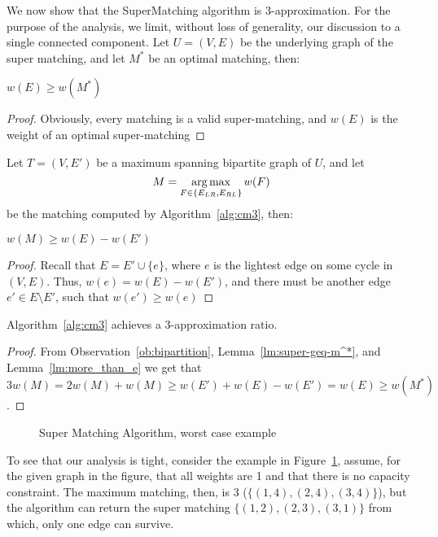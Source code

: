 We now show that the SuperMatching algorithm is 3-approximation.
For the purpose of the analysis, we limit, without loss of generality, 
our discussion to a single connected component.
Let $U = (V, E)$ be the underlying graph of the super matching, 
and let $M^*$ be an optimal matching, then:
\begin{lemma}
\label{lm:super-geq-m^*}
$w(E) \geq w(M^*)$
\end{lemma}

\begin{proof}
Obviously, every matching is a valid super-matching, 
and $w(E)$ is the weight of an optimal super-matching 
\end{proof}

Let $T = (V, E')$ be a maximum spanning bipartite graph of $U$,
and let 
$$M = \operatorname*{arg\,max}_{F \in \{ E_{LR}, E_{RL} \}}{w(F)}$$
be the matching computed by Algorithm~\ref{alg:cm3}, then:

\begin{lemma}
\label{lm:more_than_e}
$w(M) \geq w(E) - w(E')$
\end{lemma}

\begin{proof}
Recall that $E = E' \cup \{e\}$, 
where $e$ is the lightest edge on some cycle in $(V, E)$. 
Thus, $w(e) = w(E) - w(E')$, 
and there must be another edge $e' \in E \setminus E'$, 
such that $w(e') \geq w(e)$
\end{proof}

\begin{theorem}
Algorithm~\ref{alg:cm3} achieves a 3-approximation ratio.
\end{theorem}

\begin{proof}
From Observation~\ref{ob:bipartition}, Lemma~\ref{lm:super-geq-m^*},
and Lemma~\ref{lm:more_than_e} we get that
$$ 3w(M) = 2w(M) + w(M) \geq w(E') + w(E) - w(E') = w(E) \geq w(M^*)$$.
\end{proof}

\begin{figure}
\centering

\caption{
\label{fig:3cm-tight-fig}
Super Matching Algorithm, worst case example
}
\end{figure}

To see that our analysis is tight, consider the example in Figure~\ref{fig:3cm-tight-fig},
assume, for the given graph in the figure, 
that all weights are 1 and that there is no capacity constraint.
The maximum matching, then, is 3 ($\{(1,4), (2,4), (3,4)\}$), 
but the algorithm can return the super matching $\{(1,2), (2,3), (3,1)\}$ from which, 
only one edge can survive.  